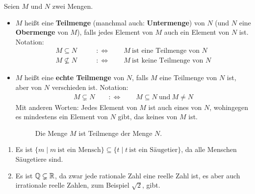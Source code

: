 \begin{de}[Teilmenge] \label{def:teilmenge} 
    Seien $M$ und $N$ zwei Mengen.
    \begin{itemize}
        \item $M$ heißt eine \textbf{Teilmenge} (manchmal auch: \textbf{Untermenge}) von $N$ (und $N$ eine \textbf{Obermenge} von $M$), falls jedes Element von $M$ auch ein Element von $N$ ist. Notation:
        \begin{align*}
            M \subseteq N \qquad &:\Leftrightarrow\qquad M\ \text{ist eine Teilmenge von $N$} \\
            M \nsubseteq N \qquad &:\Leftrightarrow\qquad M\ \text{ist keine Teilmenge von $N$}
        \end{align*}
        \item $M$ heißt eine \textbf{echte Teilmenge} von $N$, falls $M$ eine Teilmenge von $N$ ist, aber von $N$ verschieden ist. Notation:
        \begin{align*}
            M\subsetneq N \qquad:\Leftrightarrow\qquad M\subseteq N\ \text{und}\ M\neq N
        \end{align*}
        Mit anderen Worten: Jedes Element von $M$ ist auch eines von $N$, wohingegen es mindestens ein Element von $N$ gibt, das keines von $M$ ist.
        \begin{figure}[ht]
            \centering \caption{Die Menge $M$ ist Teilmenge der Menge $N$.}
        \end{figure}
    \end{itemize}
\end{de}


\begin{bsp} \quad
    \begin{enumerate}
        \item Es ist $\{m\mid m\ \text{ist ein Mensch}\}\subseteq \{t\mid t\ \text{ist ein Säugetier}\}$, da alle Menschen Säugetiere sind.
        \item Es ist $\mathbb Q\subsetneq \mathbb R$, da zwar jede rationale Zahl eine reelle Zahl ist, es aber auch irrationale reelle Zahlen, zum Beispiel $\sqrt{2}$, gibt.
    \end{enumerate}
\end{bsp}


